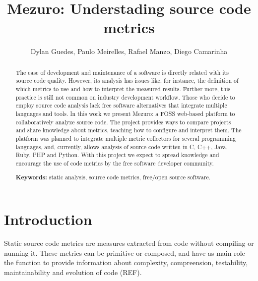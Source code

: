 \documentclass{llncs}
\begin{document}
\sloppy
\title{Mezuro: Understading source code metrics}

\author{Dylan Guedes, Paulo Meirelles,
        Rafael Manzo, Diego Camarinha}



\maketitle
\begin{abstract}
  The ease of development and maintenance of a software is directly related
with its source code quality.
  However, its analysis has issues like, for instance, the definition of which
metrics to use and how to interpret the measured results. Further more, this practice
is still not common on industry development workflow. Those who decide to employ
source code analysis lack free software alternatives that integrate multiple languages
and tools.
In this work we present Mezuro: a FOSS web-based platform to collaboratively analyze
source code. The project provides ways to compare projects and share knowledge
about metrics, teaching how to configure and interpret them. The platform was
planned to integrate multiple metric collectors for several programming
languages, and, currently, allows analysis of source code written in C, C++,
Java, Ruby, PHP and Python.
    With this project we expect to spread knowledge and encourage the use of
code metrics by the free software developer community.

\textbf{Keywords:} static analysis, source code metrics, free/open source software.
\end{abstract}

\section{Introduction}
\label{sec:intro}

Static source code metrics are measures extracted from code without compiling
or nunning it. These metrics can be primitive or composed, and have as main
role the function to provide information about complexity, compreension,
testability, maintainability and evolution of code (REF).
\end{document}
